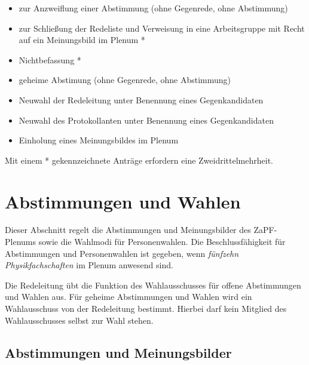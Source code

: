 \documentclass[draft,12pt,oneside]{scrreprt}
\begin{document}
\begin{enumerate}
\begin{itemize}
      \item zur Anzweiflung einer Abstimmung (ohne Gegenrede, ohne Abstimmung)

      \item zur Schließung der Redeliste und Verweisung in eine Arbeitsgruppe mit
            Recht auf ein Meinungsbild im Plenum *

      \item Nichtbefassung *

      \item geheime Abstimung (ohne Gegenrede, ohne Abstimmung)

      \item Neuwahl der Redeleitung unter Benennung eines Gegenkandidaten

      \item Neuwahl des Protokollanten unter Benennung eines Gegenkandidaten

      \item Einholung eines Meinungsbildes im Plenum
      \end{itemize}
      Mit einem * gekennzeichnete Anträge erfordern eine Zweidrittelmehrheit.
\end{enumerate}

\section{Abstimmungen und Wahlen}

Dieser Abschnitt regelt die Abstimmungen und Meinungsbilder des ZaPF-Plenums
sowie die Wahlmodi für Personenwahlen. Die Beschlussfähigkeit für Abstimmungen
und Personenwahlen ist gegeben, wenn \textit{fünfzehn Physikfachschaften}
im Plenum anwesend sind.

Die Redeleitung übt die Funktion des Wahlausschusses für offene Abstimmungen und
Wahlen aus. Für geheime Abstimmungen und Wahlen wird ein Wahlausschuss von der
Redeleitung bestimmt. Hierbei darf kein Mitglied des Wahlausschusses selbst zur
Wahl stehen.

\subsection{Abstimmungen und Meinungsbilder}
\end{document}
